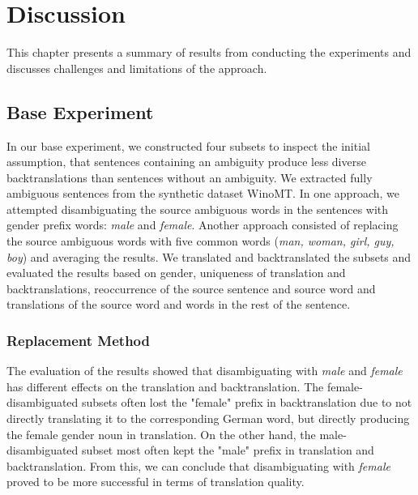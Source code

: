 \chapter{Discussion}
\label{ch:Discussion}

This chapter presents a summary of results from conducting the experiments and discusses challenges and limitations of the approach. 


\section{Base Experiment}
\label{sec:Discussion:Base}

In our base experiment, we constructed four subsets to inspect the initial assumption, that sentences containing an ambiguity produce less diverse backtranslations than sentences without an ambiguity. We extracted fully ambiguous sentences from the synthetic dataset WinoMT. In one approach, we attempted disambiguating the source ambiguous words in the sentences with gender prefix words: \textit{male} and \textit{female}. Another approach consisted of replacing the source ambiguous words with five common words (\textit{man, woman, girl, guy, boy}) and averaging the results. We translated and backtranslated the subsets and evaluated the results based on gender, uniqueness of translation and backtranslations, reoccurrence of the source sentence and source word and translations of the source word and words in the rest of the sentence.

\subsection{Replacement Method} %
The evaluation of the results showed that disambiguating with \textit{male} and \textit{female} has different effects on the translation and backtranslation. The female-disambiguated subsets often lost the "female" prefix in backtranslation due to not directly translating it to the corresponding German word, but directly producing the female gender noun in translation. On the other hand, the male-disambiguated subset most often kept the "male" prefix in translation and backtranslation. From this, we can conclude that disambiguating with \textit{female} proved to be more successful in terms of translation quality.

